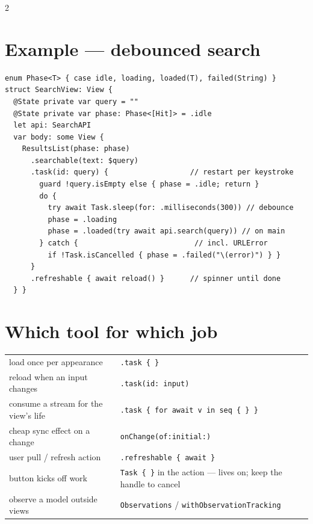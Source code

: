 \documentclass[8pt]{extarticle}
\begin{document}
\begin{multicols}{2}
\section{Example — debounced search}
\begin{lstlisting}[language=SwiftSheet]
enum Phase<T> { case idle, loading, loaded(T), failed(String) }
struct SearchView: View {
  @State private var query = ""
  @State private var phase: Phase<[Hit]> = .idle
  let api: SearchAPI
  var body: some View {
    ResultsList(phase: phase)
      .searchable(text: $query)
      .task(id: query) {                   // restart per keystroke
        guard !query.isEmpty else { phase = .idle; return }
        do {
          try await Task.sleep(for: .milliseconds(300)) // debounce
          phase = .loading
          phase = .loaded(try await api.search(query)) // on main
        } catch {                           // incl. URLError
          if !Task.isCancelled { phase = .failed("\(error)") } }
      }
      .refreshable { await reload() }      // spinner until done
  } }
\end{lstlisting}

\columnbreak

\section{Which tool for which job}
{\footnotesize
\begin{tabular}{@{}p{33mm}p{43mm}@{}}
\toprule
load once per appearance & \texttt{.task \{ \}} \\
reload when an input changes & \texttt{.task(id: input)} \\
consume a stream for the view's life & \texttt{.task \{ for await v in seq \{ \} \}} \\
cheap sync effect on a change & \texttt{onChange(of:initial:)} \\
user pull / refresh action & \texttt{.refreshable \{ await \}} \\
button kicks off work & \texttt{Task \{ \}} in the action — lives on; keep the handle to cancel \\
observe a model outside views & \texttt{Observations} / \texttt{withObservationTracking} \\
\bottomrule
\end{tabular}\par}


\end{multicols}
\end{document}
